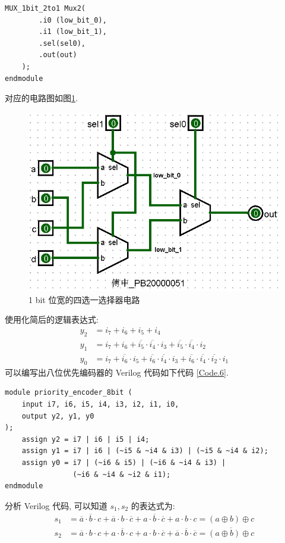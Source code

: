 \documentclass[UTF8,fontset=fandol]{ctexart}
\begin{document}
\begin{ExQuestions}
\begin{lstlisting}[style=verilogstyle, caption={1 bit 位宽的四选一选择器}, label={Code.5}]
    MUX_1bit_2to1 Mux2(
        .i0 (low_bit_0),
        .i1 (low_bit_1),
        .sel(sel0),
        .out(out)
    );
endmodule
  \end{lstlisting}
对应的电路图如图\ref{Fig.7}.
  \begin{figure}[H]
    \centering
    \label{Fig.7}
    \includegraphics[width = .5\linewidth]{images/Fig.7.jpg}
    \caption{1 bit 位宽的四选一选择器电路}
  \end{figure}
  \question 使用化简后的逻辑表达式:
  \begin{align*}
    y_2 &= i_7 + i_6 + i_5 + i_4\\
    y_1 &= i_7 + i_6 + \overline{i_5} \cdot \overline{i_4} \cdot i_3 + \overline{i_5} \cdot \overline{i_4} \cdot i_2\\
    y_0 &= i_7 + \overline{i_6} \cdot i_5 + \overline{i_6} \cdot \overline{i_4} \cdot i_3 + \overline{i_6} \cdot \overline{i_4} \cdot \overline{i_2} \cdot i_1
  \end{align*}
  可以编写出八位优先编码器的 Verilog 代码如下代码 \ref{Code.6}.
  \begin{lstlisting}[style=verilogstyle, caption={八位优先编码器}, label={Code.6}]
module priority_encoder_8bit (
    input i7, i6, i5, i4, i3, i2, i1, i0,
    output y2, y1, y0
);
    assign y2 = i7 | i6 | i5 | i4;
    assign y1 = i7 | i6 | (~i5 & ~i4 & i3) | (~i5 & ~i4 & i2);
    assign y0 = i7 | (~i6 & i5) | (~i6 & ~i4 & i3) | 
                (~i6 & ~i4 & ~i2 & i1);
endmodule
  \end{lstlisting}
  \question 分析 Verilog 代码, 可以知道 $s_1, s_2$ 的表达式为:
  \begin{align*}
    s_1 &= \overline{a} \cdot \overline{b} \cdot c + \overline{a} \cdot b \cdot \overline{c} + a \cdot \overline{b} \cdot \overline{c} + a\cdot b \cdot c = (a\oplus b)\oplus c\\
    s_2 &= \overline{a} \cdot b \cdot c + a \cdot \overline{b} \cdot c + a \cdot b \cdot \overline{c} + \overline{a} \cdot \overline{b} \cdot \overline{c} = \overline{(a\oplus b)\oplus c}
  \end{align*}

\end{ExQuestions}
\end{document}
